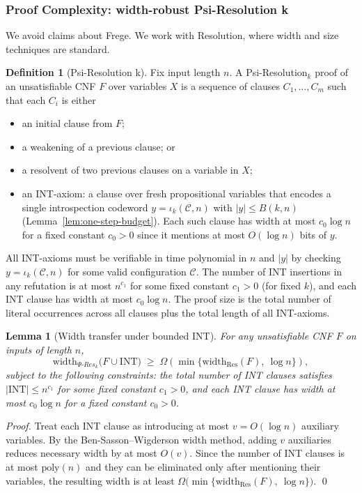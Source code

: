 \documentclass[11pt]{article}
\newtheorem{lemma}[theorem]{Lemma}
\theoremstyle{plain}
\theoremstyle{definition}
\newtheorem{definition}[theorem]{Definition}
\begin{document}
\subsubsection{Proof Complexity: width-robust Psi-Resolution k}
\label{sec:proof-complexity}

We avoid claims about Frege. We work with Resolution, where width and size techniques are standard.

\begin{definition}[Psi-Resolution k]
Fix input length $n$. A Psi-Resolution$_k$ proof of an unsatisfiable CNF $F$ over variables $X$ is a sequence of clauses $C_1,\ldots,C_m$ such that each $C_i$ is either
\begin{itemize}
  \item an initial clause from $F$;
  \item a weakening of a previous clause; or
  \item a resolvent of two previous clauses on a variable in $X$;
  \item an INT-axiom: a clause over fresh propositional variables that encodes a single introspection codeword $y=\iota_k(\mathcal{C},n)$ with $|y|\le B(k,n)$ (Lemma~\ref{lem:one-step-budget}). Each such clause has width at most $c_0\log n$ for a fixed constant $c_0>0$ since it mentions at most $O(\log n)$ bits of $y$.
\end{itemize}
All INT-axioms must be verifiable in time polynomial in $n$ and $|y|$ by checking $y=\iota_k(\mathcal{C},n)$ for some valid configuration $\mathcal{C}$. The number of INT insertions in any refutation is at most $n^{c_1}$ for some fixed constant $c_1>0$ (for fixed $k$), and each INT clause has width at most $c_0\log n$. The proof size is the total number of literal occurrences across all clauses plus the total length of all INT-axioms.
\end{definition}

\begin{lemma}[Width transfer under bounded INT]
\label{lem:psi-res-width}
For any unsatisfiable CNF $F$ on inputs of length $n$,
\[
\mathrm{width}_{\Psi\text{-}Res_k}\big(F\cup \mathrm{INT}\big) \;\ge\; \Omega\!\left( \min\{\mathrm{width}_{\mathrm{Res}}(F),\ \log n\}\right),
\]
subject to the following constraints: the total number of INT clauses satisfies $|\mathrm{INT}|\le n^{c_1}$ for some fixed constant $c_1>0$, and each INT clause has width at most $c_0\log n$ for a fixed constant $c_0>0$.
\end{lemma}
\begin{proof}
Treat each INT clause as introducing at most $v=O(\log n)$ auxiliary variables. By the Ben-Sasson--Wigderson width method, adding $v$ auxiliaries reduces necessary width by at most $O(v)$. Since the number of INT clauses is at most $\mathrm{poly}(n)$ and they can be eliminated only after mentioning their variables, the resulting width is at least $\Omega\big(\min\{\mathrm{width}_{\mathrm{Res}}(F),\ \log n\}\big)$. \qed
\end{proof}
\end{document}
